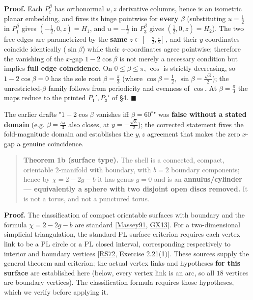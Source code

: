 \documentclass[
  11pt,
  a4paper,
]{article}
\begin{document}
\textbf{Proof.} Each \(P_i^\beta\) has orthonormal \(u,z\) derivative columns, hence is an isometric planar embedding, and fixes its hinge pointwise for \textbf{every} \(\beta\) (substituting \(u=\tfrac12\) in \(P_1^\beta\) gives \((-\tfrac12,0,z)=H_1\), and \(u=-\tfrac12\) in \(P_3^\beta\) gives \((\tfrac12,0,z)=H_2\)). The two free edges are parametrized by the \textbf{same} \(z\in[-\tfrac{s}{2},\tfrac{s}{2}]\), and their \(y\)-coordinates coincide identically (\(\sin\beta\)) while their \(z\)-coordinates agree pointwise; therefore the vanishing of the \(x\)-gap \(1-2\cos\beta\) is not merely a necessary condition but implies \textbf{full edge coincidence}. On \(0\le\beta\le\pi\), \(\cos\) is strictly decreasing, so \(1-2\cos\beta=0\) has the sole root \(\beta=\tfrac{\pi}{3}\) (where \(\cos\beta=\tfrac12\), \(\sin\beta=\tfrac{\sqrt3}{2}\)); the unrestricted-\(\beta\) family follows from periodicity and evenness of \(\cos\). At \(\beta=\tfrac{\pi}{3}\) the maps reduce to the printed \(P_1',P_3'\) of §4. \(\blacksquare\)

The earlier draft\textquotesingle s "\(1-2\cos\beta\) vanishes iff \(\beta=60^\circ\)" was \textbf{false without a stated domain} (e.g. \(\beta=\tfrac{5\pi}{3}\) also closes, at \(y=-\tfrac{\sqrt3}{2}\)); the corrected statement fixes the fold-magnitude domain and establishes the \(y,z\) agreement that makes the zero \(x\)-gap a genuine coincidence.

\begin{quote}
\textbf{Theorem 1b (surface type).} The shell is a connected, compact, orientable \(2\)-manifold with boundary, with \(b=2\) boundary components; hence by \(\chi=2-2g-b\) it has genus \(g=0\) and is an \textbf{annulus/cylinder --- equivalently a sphere with two disjoint open discs removed.} It is not a torus, and not a punctured torus.
\end{quote}

\textbf{Proof.} The classification of compact orientable surfaces with boundary and the formula \(\chi=2-2g-b\) are standard {[}\hyperlink{ref-Massey91}{Massey91}, \hyperlink{ref-GX13}{GX13}{]}. For a two-dimensional simplicial triangulation, the standard PL surface criterion requires each vertex link to be a PL circle or a PL closed interval, corresponding respectively to interior and boundary vertices {[}\hyperlink{ref-RS72}{RS72}, Exercise 2.21(1){]}. These sources supply the general theorem and criterion; the actual vertex links and hypotheses \textbf{for this surface} are established here (below, every vertex link is an arc, so all \(18\) vertices are boundary vertices). The classification formula requires those hypotheses, which we verify before applying it.
\end{document}
